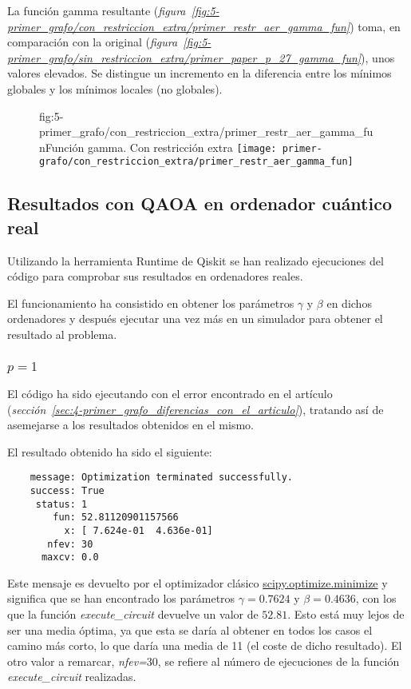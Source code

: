 La función gamma resultante (\textit{figura~\ref{fig:5-primer_grafo/con_restriccion_extra/primer_restr_aer_gamma_fun}}) toma, en comparación con la original (\textit{figura~\ref{fig:5-primer_grafo/sin_restriccion_extra/primer_paper_p_27_gamma_fun}}), unos valores elevados.
Se distingue un incremento en la diferencia entre los mínimos globales y los mínimos locales (no globales).

\begin{figure}[htbp]{fig:5-primer_grafo/con_restriccion_extra/primer_restr_aer_gamma_fun}{Función gamma. Con restricción extra}
  \centering
  \texttt{[image: primer-grafo/con\_restriccion\_extra/primer\_restr\_aer\_gamma\_fun]}
\end{figure}

\subsection{Resultados con QAOA en ordenador cuántico real}
Utilizando la herramienta Runtime de Qiskit se han realizado ejecuciones del código para comprobar sus resultados en ordenadores reales.

El funcionamiento ha consistido en obtener los parámetros $\gamma$ y $\beta$ en dichos ordenadores y después ejecutar una vez más en un simulador para obtener el resultado al problema.

\subsubsection{\(p = 1\)}
El código ha sido ejecutando con el error encontrado en el artículo (\textit{sección~\ref{sec:4-primer_grafo_diferencias_con_el_articulo}}), tratando así de asemejarse a los resultados obtenidos en el mismo.

El resultado obtenido ha sido el siguiente:

\begin{verbatim}
    message: Optimization terminated successfully.
    success: True
     status: 1
        fun: 52.81120901157566
          x: [ 7.624e-01  4.636e-01]
       nfev: 30
      maxcv: 0.0
\end{verbatim}

Este mensaje es devuelto por el optimizador clásico \href{https://docs.scipy.org/doc/scipy/reference/generated/scipy.optimize.minimize.html}{scipy.optimize.minimize}
y significa que se han encontrado los parámetros $\gamma = 0.7624$ y $\beta = 0.4636$, con los que la función \textit{execute\_circuit} devuelve un valor de $52.81$. Esto está muy lejos de ser una media óptima, ya que esta se daría al obtener en todos los casos el camino más corto, lo que daría una media de 11 (el coste de dicho resultado).
El otro valor a remarcar, \textit{nfev=$30$}, se refiere al número de ejecuciones de la función \textit{execute\_circuit} realizadas.

